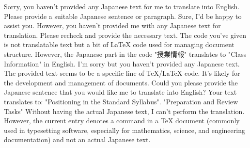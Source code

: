 Sorry, you haven't provided any Japanese text for me to translate into English. Please provide a suitable Japanese sentence or paragraph.
Sure, I'd be happy to assist you. However, you haven't provided me with any Japanese text for translation. Please recheck and provide the necessary text.
The code you've given is not translatable text but a bit of LaTeX code used for managing document structure. However, the Japanese part in the code "授業情報" translates to "Class Information" in English.
I'm sorry but you haven't provided any Japanese text. The provided text seems to be a specific line of TeX/LaTeX code. It's likely for the development and management of documents. Could you please provide the Japanese sentence that you would like me to translate into English?
Your text translates to: "Positioning in the Standard Syllabus".
"Preparation and Review Tasks"
Without having the actual Japanese text, I can't perform the translation. However, the current entry denotes a command in a TeX document (commonly used in typesetting software, especially for mathematics, science, and engineering documentation) and not an actual Japanese text.

